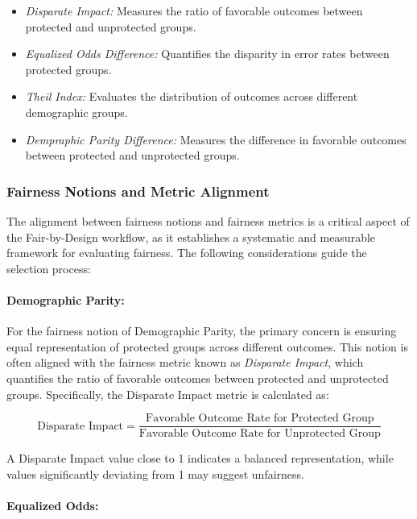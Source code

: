 \begin{itemize}
   
    \item \emph{Disparate Impact:} Measures the ratio of favorable outcomes between protected and unprotected groups.
   
    \item \emph{Equalized Odds Difference:} Quantifies the disparity in error rates between protected groups.
   
    \item \emph{Theil Index:} Evaluates the distribution of outcomes across different demographic groups.
   
    \item \emph{Dempraphic Parity Difference:} Measures the difference in favorable outcomes between protected and unprotected groups.

\end{itemize}

\subsubsection{Fairness Notions and Metric Alignment}
\label{subsub:alignment}

The alignment between fairness notions and fairness metrics is a critical aspect of the Fair-by-Design workflow, as it establishes a systematic and measurable framework for evaluating fairness. The following considerations guide the selection process:

\paragraph{Demographic Parity:}

For the fairness notion of Demographic Parity, the primary concern is ensuring equal representation of protected groups across different outcomes. This notion is often aligned with the fairness metric known as \emph{Disparate Impact}, which quantifies the ratio of favorable outcomes between protected and unprotected groups. Specifically, the Disparate Impact metric is calculated as:

\[
\text{Disparate Impact} = \frac{\text{Favorable Outcome Rate for Protected Group}}{\text{Favorable Outcome Rate for Unprotected Group}}
\]

A Disparate Impact value close to 1 indicates a balanced representation, while values significantly deviating from 1 may suggest unfairness.

\paragraph{Equalized Odds:}

